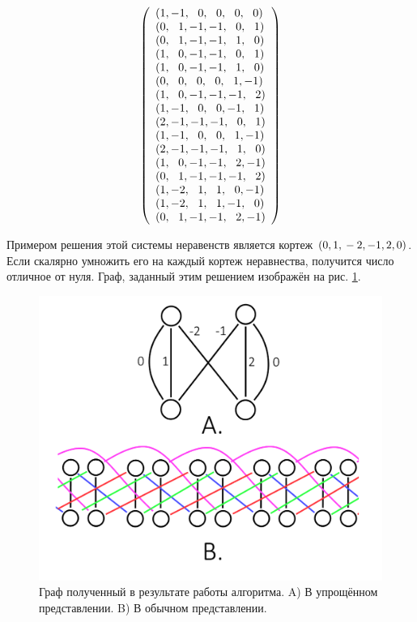 \documentclass[14pt]{mmcs-article}
\begin{document}
\begin{equation}
  \centering
    \left(
      \begin{array}{ll}
        (1,-1,\ \ 0,\ \ 0,\ \ 0,\ \ 0)\\
        (0,\ \ 1,-1,-1,\ \ 0,\ \ 1)\\
        (0,\ \ 1,-1,-1,\ \ 1,\ \ 0)\\
        (1,\ \ 0,-1,-1,\ \ 0,\ \ 1)\\
        (1,\ \ 0,-1,-1,\ \ 1,\ \ 0)\\
        (0,\ \ 0,\ \ 0,\ \ 0,\ \ 1,-1)\\
        (1,\ \ 0,-1,-1,-1,\ \ 2)\\
        (1,-1,\ \ 0,\ \ 0,-1,\ \ 1)\\
        (2,-1,-1,-1,\ \ 0,\ \ 1)\\
        (1,-1,\ \ 0,\ \ 0,\ \ 1,-1)\\
        (2,-1,-1,-1,\ \ 1,\ \ 0)\\
        (1,\ \ 0,-1,-1,\ \ 2,-1)\\
        (0,\ \ 1,-1,-1,-1,\ \ 2)\\
        (1,-2,\ \ 1,\ \ 1,\ \ 0,-1)\\
        (1,-2,\ \ 1,\ \ 1,-1,\ \ 0)\\
        (0,\ \ 1,-1,-1,\ \ 2,-1)\\
      \end{array}
    \right)
  \label{eqs:2}
\end{equation}

Примером решения этой системы неравенств является кортеж $(0, 1,\\ -2, -1, 2, 0)$. Если скалярно умножить его на каждый кортеж неравнества, получится число отличное от нуля. Граф, заданный этим решением изображён на рис. \ref{image:7}.

\begin{figure}[H]
  \centering
  \includegraphics[scale=0.4]{Fig_7.png}
  \caption{ Граф полученный в результате работы алгоритма. A) В упрощённом представлении. B) В обычном представлении. }
  \label{image:7}
\end{figure}
\end{document}
